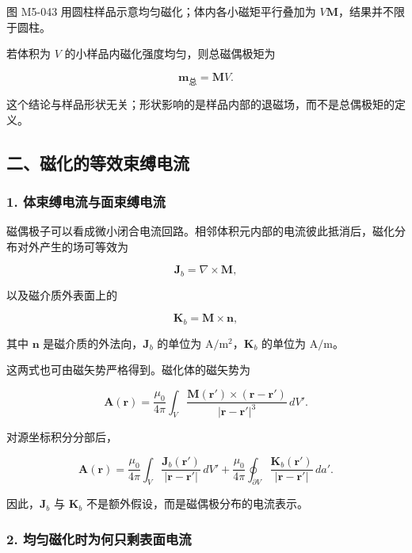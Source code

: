 图 M5-043 用圆柱样品示意均匀磁化；体内各小磁矩平行叠加为
\(V\mathbf M\)，结果并不限于圆柱。

若体积为 \(V\) 的小样品内磁化强度均匀，则总磁偶极矩为

\[
\boxed{\mathbf m_{\mathrm{\text{总}}}=\mathbf M V}.
\]

这个结论与样品形状无关；形状影响的是样品内部的退磁场，而不是总偶极矩的定义。

\subsection{二、磁化的等效束缚电流}\label{m5:ux4e8cux78c1ux5316ux7684ux7b49ux6548ux675fux7f1aux7535ux6d41}

\subsubsection{1.
体束缚电流与面束缚电流}\label{m5:ux4f53ux675fux7f1aux7535ux6d41ux4e0eux9762ux675fux7f1aux7535ux6d41}

磁偶极子可以看成微小闭合电流回路。相邻体积元内部的电流彼此抵消后，磁化分布对外产生的场可等效为

\[
\boxed{\mathbf J_b=\nabla\times\mathbf M},
\]

以及磁介质外表面上的

\[
\boxed{\mathbf K_b=\mathbf M\times\mathbf n},
\]

其中 \(\mathbf n\) 是磁介质的外法向，\(\mathbf J_b\) 的单位为
\(\mathrm{A/m^2}\)，\(\mathbf K_b\) 的单位为 \(\mathrm{A/m}\)。

这两式也可由磁矢势严格得到。磁化体的磁矢势为

\[
\mathbf A(\mathbf r)
=\frac{\mu_0}{4\pi}
\int_V
\frac{\mathbf M(\mathbf r')\times(\mathbf r-\mathbf r')}
{|\mathbf r-\mathbf r'|^3}\,dV'.
\]

对源坐标积分分部后，

\[
\boxed{
\mathbf A(\mathbf r)
=\frac{\mu_0}{4\pi}
\int_V\frac{\mathbf J_b(\mathbf r')}{|\mathbf r-\mathbf r'|}\,dV'
+\frac{\mu_0}{4\pi}
\oint_{\partial V}\frac{\mathbf K_b(\mathbf r')}{|\mathbf r-\mathbf r'|}\,da'
}.
\]

因此，\(\mathbf J_b\) 与 \(\mathbf K_b\)
不是额外假设，而是磁偶极分布的电流表示。

\subsubsection{2.
均匀磁化时为何只剩表面电流}\label{m5:ux5747ux5300ux78c1ux5316ux65f6ux4e3aux4f55ux53eaux5269ux8868ux9762ux7535ux6d41}

